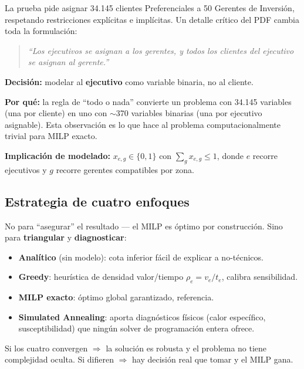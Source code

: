 \documentclass[11pt,a4paper]{article}
\begin{document}
La prueba pide asignar 34.145 clientes Preferenciales a 50 Gerentes de Inversión, respetando restricciones explícitas e implícitas. Un detalle crítico del PDF cambia toda la formulación:

\begin{quote}
\itshape \color{bconegro}
``Los ejecutivos se asignan a los gerentes, y todos los clientes del ejecutivo se asignan al gerente.''
\end{quote}

\begin{decisionbox}
\textbf{Decisión:} modelar al \textbf{ejecutivo} como variable binaria, no al cliente.

\textbf{Por qué:} la regla de ``todo o nada'' convierte un problema con 34.145 variables (una por cliente) en uno con $\sim$370 variables binarias (una por ejecutivo asignable). Esta observación es lo que hace al problema computacionalmente trivial para MILP exacto.

\textbf{Implicación de modelado:} $x_{e,g} \in \{0,1\}$ con $\sum_g x_{e,g} \le 1$, donde $e$ recorre ejecutivos y $g$ recorre gerentes compatibles por zona.
\end{decisionbox}

\subsection{Estrategia de cuatro enfoques}

\begin{decisionbox}
No para ``asegurar'' el resultado --- el MILP es óptimo por construcción. Sino para \textbf{triangular} y \textbf{diagnosticar}:

\begin{itemize}
    \item \textbf{Analítico} (sin modelo): cota inferior fácil de explicar a no-técnicos.
    \item \textbf{Greedy}: heurística de densidad valor/tiempo $\rho_e = v_e / t_e$, calibra sensibilidad.
    \item \textbf{MILP exacto}: óptimo global garantizado, referencia.
    \item \textbf{Simulated Annealing}: aporta diagnósticos físicos (calor específico, susceptibilidad) que ningún solver de programación entera ofrece.
\end{itemize}

Si los cuatro convergen $\Rightarrow$ la solución es robusta y el problema no tiene complejidad oculta. Si difieren $\Rightarrow$ hay decisión real que tomar y el MILP gana.
\end{decisionbox}
\end{document}
